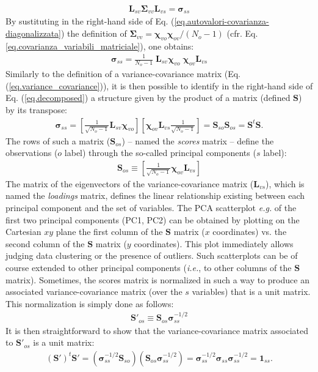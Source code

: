 \documentclass[11pt]{amsart}
\begin{document}
%
\begin{eqnarray}
\label{eq.autovalori-covarianza-diagonalizzata}
\bm L_{sv} \bm \Sigma_{vv} \bm L_{vs}
=
\bm \sigma_{ss}
\end{eqnarray}
%
By sustituting in the right-hand side of Eq. (\ref{eq.autovalori-covarianza-diagonalizzata}) the definition of $\bm \Sigma_{vv} = \bm \chi_{vo} \bm \chi_{ov} / (N_o-1)$ (cfr. Eq. \ref{eq.covarianza_variabili_matriciale}), one obtains:
%
\begin{eqnarray}
\bm \sigma_{ss} =
\frac{1}{N_o - 1} \; \bm L_{sv} \bm \chi_{vo} \; \bm \chi_{ov} \bm L_{vs} 
\end{eqnarray}
%
Similarly to the definition of a variance-covariance matrix (Eq. (\ref{eq.variance_covariance})), it is then possible to identify in the right-hand side of Eq. (\ref{eq.decomposed}) a structure given by the product of a matrix (defined $\bm S$) by its transpose:
%
\begin{eqnarray}
\bm \sigma_{ss}
=
\left[ \frac{1}{\sqrt{N_o - 1}} \bm L_{sv} \bm \chi_{vo} \right]
\left[ \bm \chi_{ov} \bm L_{vs} \frac{1}{\sqrt{N_o - 1}} \right] 
=
\bm S_{so} \bm S_{os}
=
\bm S^t \bm S.
\end{eqnarray}
%
The rows of such a matrix ($\bm S_{os}$) -- named the {\em scores} matrix -- define the observations ($o$ label) through the so-called principal components ($s$ label):
%
\begin{eqnarray}
\label{eq.scores}
\bm S_{os} \equiv \left[ \frac{1}{\sqrt{N_o - 1}} \bm \chi_{ov} \bm L_{vs} \right]
\end{eqnarray}
%
The matrix of the eigenvectors of the variance-covariance matrix ($\bm L_{vs}$), which is named the {\em loadings} matrix, defines the linear relationship existing between each principal component and the set of variables.
%
The PCA scatterplot {\em e.g.} of the first two principal components (PC1, PC2) can be obtained by plotting on the Cartesian $xy$ plane the first column of the $\bm S$ matrix ($x$ coordinates) vs. the second column of the $\bm S$ matrix ($y$ coordinates). This plot immediately allows judging data clustering or the presence of outliers. Such scatterplots can be of course extended to other principal components ({\em i.e.}, to other columns of the $\bm S$ matrix).
Sometimes, the scores matrix is normalized in such a way to produce an associated variance-covariance matrix (over the $s$ variables) that is a unit matrix. This normalization is simply done as follows:
%
\begin{eqnarray}
\bm S'_{os} \equiv \bm S_{os} \bm \sigma_{ss}^{-1/2}
\end{eqnarray}
%
It is then straightforward to show that the variance-covariance matrix associated to $\bm S'_{os}$ is a unit matrix:
%
\begin{eqnarray}
(\bm S')^t \bm S' = 
%
\left( \bm \sigma_{ss}^{-1/2} \bm S_{so} \right) \left( \bm S_{os} \bm \sigma_{ss}^{-1/2} \right) =
%
\bm \sigma_{ss}^{-1/2} \bm \sigma_{ss} \bm \sigma_{ss}^{-1/2} = {\bm 1}_{ss}.
\end{eqnarray}


 

\end{document}
